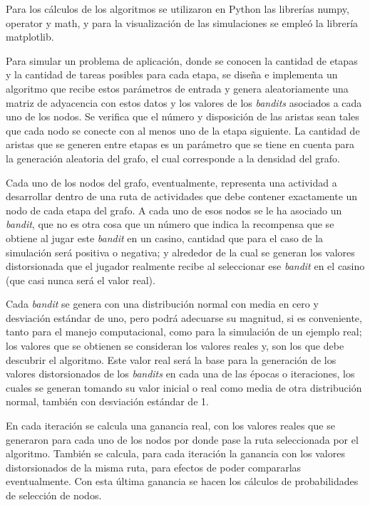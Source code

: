 Para los cálculos de los algoritmos se utilizaron en Python las librerías numpy, operator y math, y para la visualización de las simulaciones se empleó la librería matplotlib.

Para simular un problema de aplicación, donde se conocen la cantidad de etapas y la cantidad de tareas posibles para cada etapa, se diseña e implementa un algoritmo que recibe estos parámetros de entrada y genera aleatoriamente una matriz de adyacencia con estos datos y los valores de los \textit{bandits} asociados a cada uno de los nodos. Se verifica que el número y disposición de las aristas sean tales que cada nodo se conecte con al menos uno de la etapa siguiente. 
La cantidad de aristas que se generen entre etapas es un parámetro que se tiene en cuenta para la generación aleatoria del grafo, el cual corresponde a la densidad del grafo.

Cada uno de los nodos del grafo, eventualmente, representa una actividad a desarrollar dentro de una ruta de actividades que debe contener exactamente un nodo de cada etapa del grafo. A cada uno de esos nodos se le ha asociado un \textit{bandit}, que no es otra cosa que un número que indica la recompensa que se obtiene al jugar este \textit{bandit} en un casino, cantidad que para el caso de la simulación será positiva o negativa; y alrededor de la cual se generan los valores distorsionada que el jugador realmente recibe al seleccionar ese \textit{bandit} en el casino (que casi nunca será el valor real).

Cada \textit{bandit} se genera con una distribución normal con media en cero y desviación estándar de uno, pero podrá adecuarse su magnitud, si es conveniente, tanto para el manejo computacional, como para la simulación de un ejemplo real; los valores que se obtienen se consideran los valores reales y, son los que debe descubrir el algoritmo. Este valor real será la base para la generación de los valores distorsionados de los \textit{bandits} en cada una de las épocas o iteraciones, los cuales se generan tomando su valor inicial o real como media de otra distribución normal, también con desviación estándar de 1.

En cada iteración se calcula una ganancia real, con los valores reales que se generaron para cada uno de los nodos por donde pase la ruta seleccionada por el algoritmo. También se calcula, para cada iteración la ganancia con los valores distorsionados de la misma ruta, para efectos de poder compararlas eventualmente. Con esta última ganancia se hacen los cálculos de probabilidades de selección de nodos.

